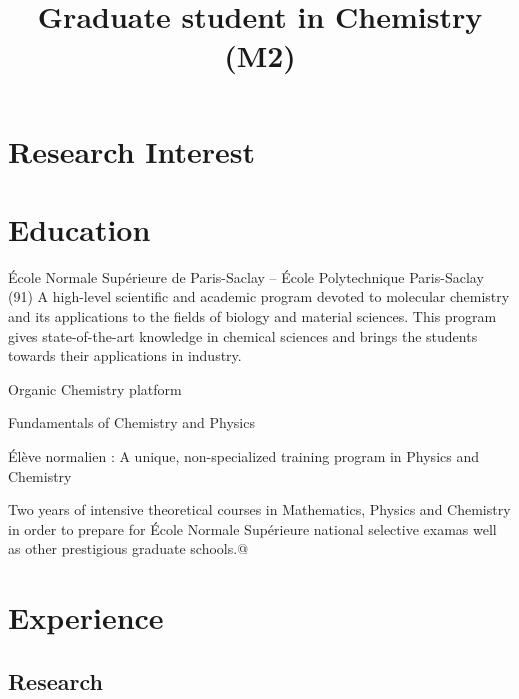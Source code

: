 \documentclass[11pt,a4paper,sans]{moderncv}
\title{Graduate student in Chemistry (M2)}
\begin{document}
\makecvtitle

%
\section{Research Interest}

%
\section{Education}
%
{{\newline}École Normale Supérieure de Paris-Saclay -- École Polytechnique}%
{Paris-Saclay (91)}{}%
{A high-level scientific and academic program devoted to molecular chemistry and its applications to the fields of biology and material sciences. This program gives state-of-the-art knowledge in chemical sciences and brings the students towards their applications in industry.}

%
%
{Organic Chemistry platform}

%
{Fundamentals of Chemistry and Physics}

%
{Élève normalien : A unique, non-specialized training program in Physics and Chemistry}

%
{Two years of intensive theoretical courses in Mathematics, Physics and Chemistry in order to prepare for École Normale Supérieure national selective examas well as other prestigious graduate schools.@}

%

\section{Experience}
%

\subsection{Research}
\end{document}
